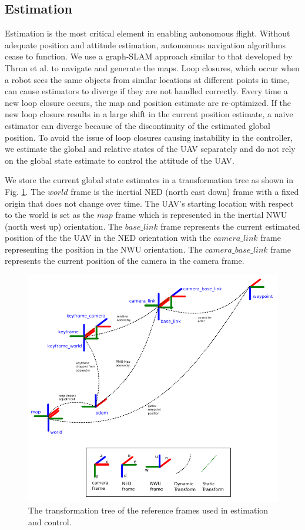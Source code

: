 \documentclass[letterpaper, 10 pt, conference]{ieeeconf}  %
\begin{document}
\subsection{Estimation}

Estimation is the most critical element in enabling autonomous flight. Without adequate position and attitude estimation, autonomous navigation algorithms cease to function. We use a graph-SLAM approach similar to that developed by Thrun et al. \cite{Thrun2006} to navigate and generate the maps. Loop closures, which occur when a robot sees the same objects from similar locations at different points in time, can cause estimators to diverge if they are not handled correctly. Every time a new loop closure occurs, the map and position estimate are re-optimized. If the new loop closure results in a large shift in the current position estimate, a naive estimator can diverge because of the discontinuity of the estimated global position. To avoid the issue of loop closures causing instability in the controller, we estimate the global and relative states of the UAV separately and do not rely on the global state estimate to control the attitude of the UAV.

We store the current global state estimates in a transformation tree as shown in Fig. \ref{fig:tf_tree}. The $\mathit{world}$ frame is the inertial NED (north east down) frame with a fixed origin that does not change over time. The UAV's starting location with respect to the world is set as the $\mathit{map}$ frame which is represented in the inertial NWU (north west up) orientation. The $\mathit{base\_link}$ frame represents the current estimated position of the the UAV in the NED orientation with the $\mathit{camera\_link}$ frame representing the position in the NWU orientation. The $\mathit{camera\_base\_link}$ frame represents the current position of the camera in the camera frame.

\begin{figure}
\centering
\includegraphics[width=0.9\linewidth]{tf_tree_relative_rtab}
\caption{The transformation tree of the reference frames used in estimation and control.}
\label{fig:tf_tree}
\end{figure}
\end{document}
